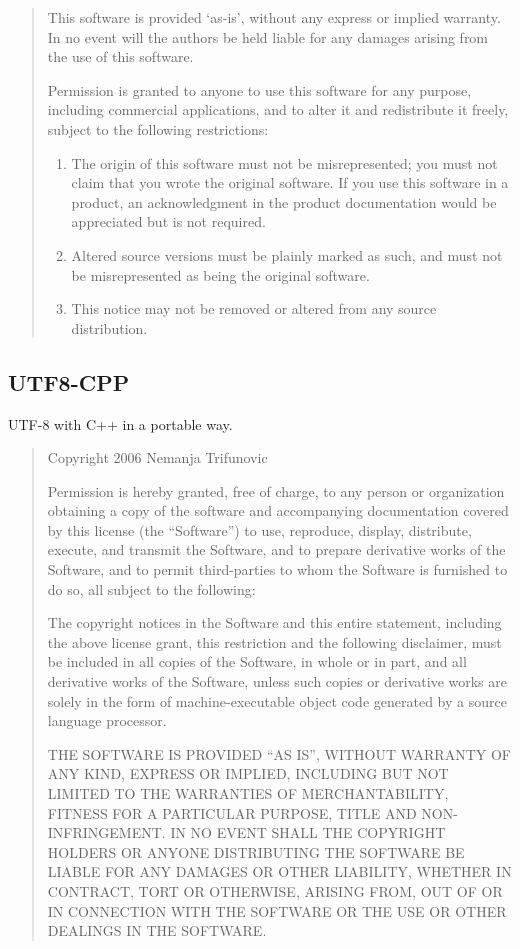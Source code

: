 \documentclass[
]{book}
\theoremstyle{definition}
\theoremstyle{definition}
\theoremstyle{definition}
\theoremstyle{definition}
\theoremstyle{remark}
\begin{document}
\begin{quote}
This software is provided `as-is', without any express or implied
warranty. In no event will the authors be held liable for any
damages arising from the use of this software.

Permission is granted to anyone to use this software for any
purpose, including commercial applications, and to alter it and
redistribute it freely, subject to the following restrictions:

\begin{enumerate}
\def\labelenumi{\arabic{enumi}.}
\item
  The origin of this software must not be misrepresented; you must
  not claim that you wrote the original software. If you use this
  software in a product, an acknowledgment in the product documentation
  would be appreciated but is not required.
\item
  Altered source versions must be plainly marked as such, and
  must not be misrepresented as being the original software.
\item
  This notice may not be removed or altered from any source
  distribution.
\end{enumerate}
\end{quote}

\hypertarget{utf8-cpp}{%
\subsection*{UTF8-CPP}\label{utf8-cpp}}

UTF-8 with C++ in a portable way.

\begin{quote}
Copyright 2006 Nemanja Trifunovic

Permission is hereby granted, free of charge, to any person or organization
obtaining a copy of the software and accompanying documentation covered by
this license (the ``Software'') to use, reproduce, display, distribute,
execute, and transmit the Software, and to prepare derivative works of the
Software, and to permit third-parties to whom the Software is furnished to
do so, all subject to the following:

The copyright notices in the Software and this entire statement, including
the above license grant, this restriction and the following disclaimer,
must be included in all copies of the Software, in whole or in part, and
all derivative works of the Software, unless such copies or derivative
works are solely in the form of machine-executable object code generated by
a source language processor.

THE SOFTWARE IS PROVIDED ``AS IS'', WITHOUT WARRANTY OF ANY KIND, EXPRESS OR
IMPLIED, INCLUDING BUT NOT LIMITED TO THE WARRANTIES OF MERCHANTABILITY,
FITNESS FOR A PARTICULAR PURPOSE, TITLE AND NON-INFRINGEMENT. IN NO EVENT
SHALL THE COPYRIGHT HOLDERS OR ANYONE DISTRIBUTING THE SOFTWARE BE LIABLE
FOR ANY DAMAGES OR OTHER LIABILITY, WHETHER IN CONTRACT, TORT OR OTHERWISE,
ARISING FROM, OUT OF OR IN CONNECTION WITH THE SOFTWARE OR THE USE OR OTHER
DEALINGS IN THE SOFTWARE.
\end{quote}
\end{document}
